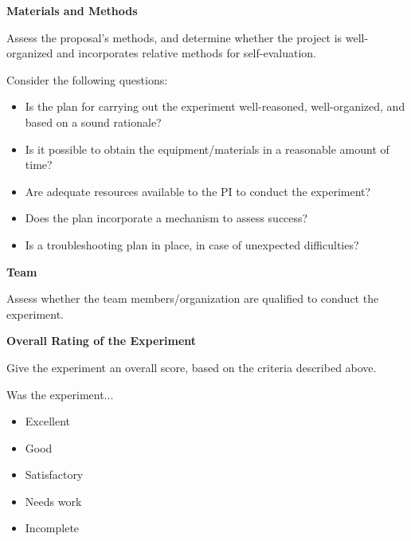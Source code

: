 \textbf{Materials and Methods}

Assess the proposal's methods, and determine whether the project is well-organized and incorporates relative methods for self-evaluation.

Consider the following questions:
\begin{itemize}
\item Is the plan for carrying out the experiment well-reasoned, well-organized, and based on a sound rationale?
\item Is it possible to obtain the equipment/materials in a reasonable amount of time?
\item Are adequate resources available to the PI to conduct the experiment?
\item Does the plan incorporate a mechanism to assess success?
\item Is a troubleshooting plan in place, in case of unexpected difficulties?
\end{itemize}

\textbf{Team}

Assess whether the team members/organization are qualified to conduct the experiment.

\textbf{Overall Rating of the Experiment}

Give the experiment an overall score, based on the criteria described above.

Was the experiment...
\begin{itemize}
\item Excellent
\item Good
\item Satisfactory
\item Needs work
\item Incomplete
\end{itemize}



